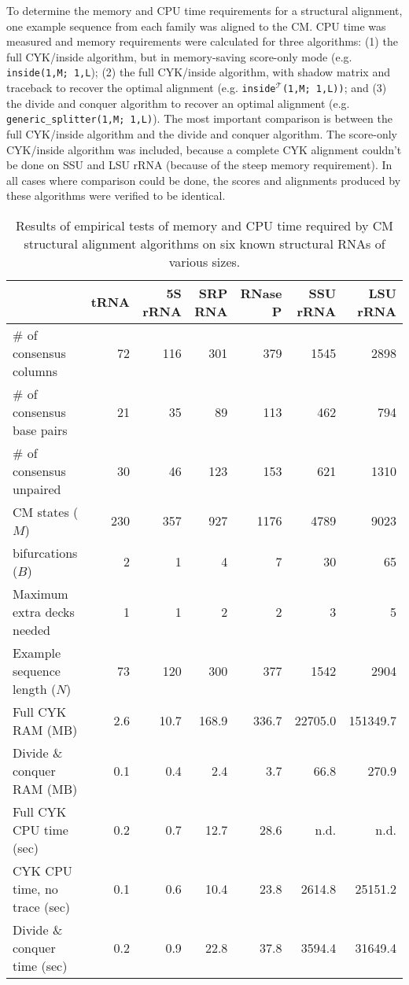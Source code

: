 \documentclass[11pt]{article}
\begin{document}
To determine the memory and CPU time requirements for a structural
alignment, one example sequence from each family was aligned to the
CM. CPU time was measured and memory requirements were calculated for
three algorithms: (1) the full CYK/inside algorithm, but in
memory-saving score-only mode (e.g. \texttt{inside(1,M; 1,L}); (2) the
full CYK/inside algorithm, with shadow matrix and traceback to recover
the optimal alignment (e.g. \texttt{inside}$^\mathcal{T}$\texttt{(1,M;
1,L))}; and (3) the divide and conquer algorithm to recover an optimal
alignment (e.g. \texttt{generic\_splitter(1,M; 1,L)}). The most
important comparison is between the full CYK/inside algorithm and the
divide and conquer algorithm. The score-only CYK/inside algorithm was
included, because a complete CYK alignment couldn't be done on SSU and
LSU rRNA (because of the steep memory requirement). In all cases where
comparison could be done, the scores and alignments produced by these
algorithms were verified to be identical.

\begin{table}[ht]
\begin{tabular}{lrrrrrr}
                             & tRNA&5S rRNA&SRP RNA&RNase P&SSU rRNA& LSU rRNA \\\hline 
\# of consensus columns      &  72 &  116 &   301 &   379 &   1545 &    2898\\ 
\# of consensus base pairs   &  21 &   35 &    89 &   113 &    462 &     794\\ 
\# of consensus unpaired     &  30 &   46 &   123 &   153 &    621 &    1310\\ 
CM states ($M$)              & 230 &  357 &   927 &  1176 &   4789 &    9023\\ 
bifurcations ($B$)           &   2 &    1 &     4 &     7 &     30 &      65\\ 
Maximum extra decks needed   &   1 &    1 &     2 &     2 &      3 &       5\\ 
Example sequence length ($N$)&  73 &  120 &   300 &   377 &   1542 &    2904\\
Full CYK RAM (MB)            & 2.6 & 10.7 & 168.9 & 336.7 &22705.0 &151349.7\\
Divide \& conquer RAM (MB)   & 0.1 &  0.4 &   2.4 &   3.7 &   66.8 &   270.9\\ 
Full CYK CPU time (sec)      & 0.2 &  0.7 &  12.7 &  28.6 &   n.d. &    n.d.\\ 
CYK CPU time, no trace (sec) & 0.1 &  0.6 &  10.4 &  23.8 & 2614.8 & 25151.2\\
Divide \& conquer time (sec) & 0.2 &  0.9 &  22.8 &  37.8 & 3594.4 & 31649.4\\\hline
\end{tabular}
\caption{Results of empirical tests of memory and CPU time required by
CM structural alignment algorithms on six known structural RNAs of
various sizes.}
\label{tbl:results}
\end{table}
\end{document}
